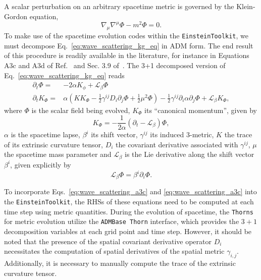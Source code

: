 A scalar perturbation on an arbitrary spacetime metric is governed by the Klein-Gordon equation,
%
\begin{equation}
  \nabla_\mu \nabla^\mu \Phi - m^2 \Phi = 0.
  \label{eq:wave_scattering_kg_eq}
\end{equation}
%
To make use of the spacetime evolution codes within the \texttt{EinsteinToolkit}, we must decompose Eq.~\eqref{eq:wave_scattering_kg_eq} in ADM form. The end result of this procedure is readily available in the literature, for instance in Equations A3c and A3d of Ref.~\cite{PhysRevD.96.104040} and Sec. 3.9 of~\cite{Ficarra2023}. The 3+1 decomposed version of Eq.~\eqref{eq:wave_scattering_kg_eq} reads
%
\begin{align}
  \partial_t \Phi =   & -2 \alpha K_\phi + \mathcal{L}_\beta \Phi \label{eq:wave_scattering_a3c}                                                                                                                                                     \\
  \partial_t K_\Phi = & \alpha \left( K K_\Phi - \frac{1}{2} \gamma^{ij} D_i \partial_j \Phi + \frac{1}{2} \mu^2 \Phi \right) - \frac{1}{2} \gamma^{ij} \partial_i \alpha \partial_j \Phi + \mathcal{L}_\beta K_\Phi, \label{eq:wave_scattering_a3d}
\end{align}
%
where $\Phi$ is the scalar field being evolved, $K_\Phi$ its ``canonical momentum'', given by
%
\begin{equation}
  K_\Phi = -\frac{1}{2\alpha} \left( \partial_t - \mathcal{L}_\beta \right)\Phi,
  \label{eq:wave_scattering_a2}
\end{equation}
%
$\alpha$ is the spacetime lapse, $\beta^i$ its shift vector, $\gamma^{ij}$ its induced 3-metric, $K$ the trace of its extrinsic curvature tensor, $D_i$ the covariant derivative associated with $\gamma^{ij}$, $\mu$ the spacetime mass parameter and $\mathcal{L}_\beta$ is the Lie derivative along the shift vector $\beta^i$, given explicitly by
%
\begin{equation}
  \mathcal{L}_\beta\Phi = \beta^i \partial_i \Phi.
  \label{eq:wave_scattering_lie_derivative}
\end{equation}

To incorporate Eqs.~\eqref{eq:wave_scattering_a3c} and \eqref{eq:wave_scattering_a3c} into the \texttt{EinsteinToolkit}, the RHSs of these equations need to be computed at each time step using metric quantities. During the evolution of spacetime, the \texttt{Thorns} for metric evolution utilize the \texttt{ADMBase Thorn} interface, which provides the $3+1$ decomposition variables at each grid point and time step. However, it should be noted that the presence of the spatial covariant derivative operator $D_i$ necessitates the computation of spatial derivatives of the spatial metric $\gamma_{i,j}$. Additionally, it is necessary to manually compute the trace of the extrinsic curvature tensor.

